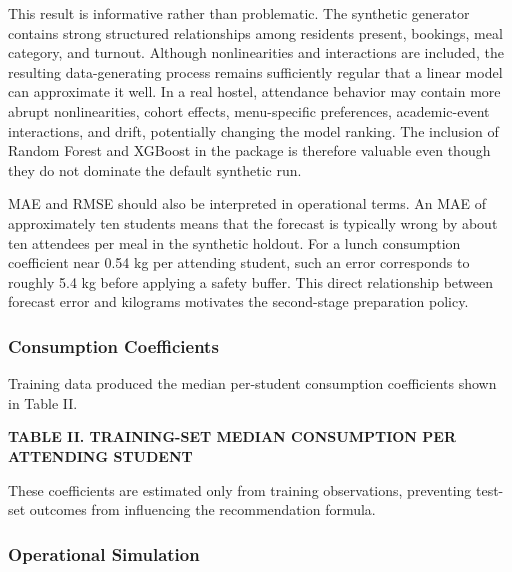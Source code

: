 \documentclass[conference]{IEEEtran}
\begin{document}
This result is informative rather than problematic. The synthetic
generator contains strong structured relationships among residents
present, bookings, meal category, and turnout. Although nonlinearities
and interactions are included, the resulting data-generating process
remains sufficiently regular that a linear model can approximate it
well. In a real hostel, attendance behavior may contain more abrupt
nonlinearities, cohort effects, menu-specific preferences,
academic-event interactions, and drift, potentially changing the model
ranking. The inclusion of Random Forest and XGBoost in the package is
therefore valuable even though they do not dominate the default
synthetic run.

MAE and RMSE should also be interpreted in operational terms. An MAE of
approximately ten students means that the forecast is typically wrong by
about ten attendees per meal in the synthetic holdout. For a lunch
consumption coefficient near 0.54 kg per attending student, such an
error corresponds to roughly 5.4 kg before applying a safety buffer.
This direct relationship between forecast error and kilograms motivates
the second-stage preparation policy.

\subsubsection{Consumption Coefficients}\label{consumption-coefficients}

Training data produced the median per-student consumption coefficients
shown in Table II.

\textbf{TABLE II. TRAINING-SET MEDIAN CONSUMPTION PER ATTENDING STUDENT}

\begin{center}
\end{center}

These coefficients are estimated only from training observations,
preventing test-set outcomes from influencing the recommendation
formula.

\subsubsection{Operational Simulation}\label{operational-simulation}
\end{document}
